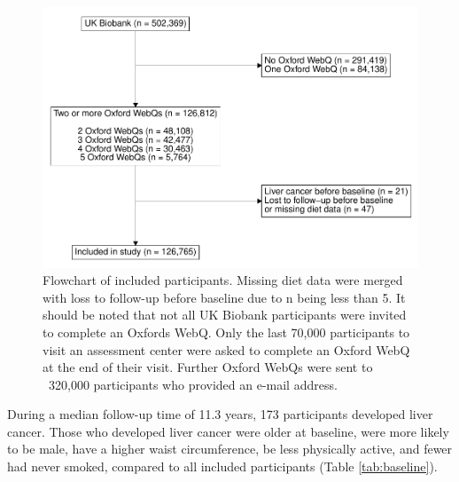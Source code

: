 \documentclass[nutrients,article,submit,moreauthors,pdftex]{Definitions/mdpi}
\begin{document}
\begin{figure}

{\centering \includegraphics[width=1\linewidth,]{legliv-nutrients_files/figure-latex/fig1-1} 

}

\caption{Flowchart of included participants. Missing diet data were merged with loss to follow-up before baseline due to n being less than 5. It should be noted that not all UK Biobank participants were invited to complete an Oxfords WebQ. Only the last 70,000 participants to visit an assessment center were asked to complete an Oxford WebQ at the end of their visit. Further Oxford WebQs were sent to ~320,000 participants who provided an e-mail address.}\label{fig:fig1}
\end{figure}

During a median follow-up time of 11.3 years, 173 participants developed
liver cancer. Those who developed liver cancer were older at baseline,
were more likely to be male, have a higher waist circumference, be less
physically active, and fewer had never smoked, compared to all included
participants (Table \ref{tab:baseline}).
\end{document}
